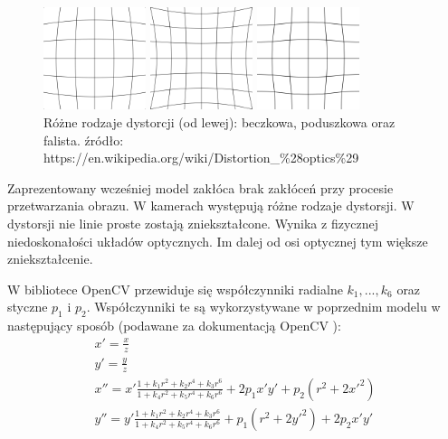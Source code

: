 \documentclass{article}
\begin{document}
\begin{figure}
\centering
		\begin{minipage}{3cm}
			\includegraphics[width=3cm]{600px-Barrel_distortion.png}
		\end{minipage}
		\begin{minipage}{3cm}
			\includegraphics[width=3cm]{600px-Pincushion_distortion.png}
		\end{minipage}
		\begin{minipage}{3cm}
			\includegraphics[width=3cm]{600px-Mustache_distortion.png}
		\end{minipage}
	\caption{Różne rodzaje dystorcji (od lewej): beczkowa, poduszkowa oraz falista.
		źródło: https://en.wikipedia.org/wiki/Distortion\_\%28optics\%29  }
	\label{fig:distortion}
\end{figure}

Zaprezentowany wcześniej model zakłóca brak zakłóceń przy procesie przetwarzania obrazu. W kamerach występują różne rodzaje dystorsji. W dystorsji nie linie proste zostają zniekształcone. Wynika z fizycznej niedoskonałości układów optycznych. Im dalej od osi optycznej tym większe zniekształcenie.

W bibliotece OpenCV przewiduje się współczynniki radialne $k_1, ..., k_6$ oraz styczne $p_1$ i $p_2$. Współczynniki te są wykorzystywane w poprzednim modelu w następujący sposób (podawane za dokumentacją OpenCV \cite{Dokumentacja OpenCV}):
\begin{gather*}
	x' = \frac{x}{z} \\
	y' = \frac{y}{z} \\
	x'' = x' \frac{1+k_1 r^2 + k_2 r^4 + k_3 r^6}{1+k_4 r^2+k_5 r^4+k_6 r^6} +
	2 p_1 x' y' + p_2(r^2 + 2 x'^2)	\\
	y'' = y' \frac{1+k_1 r^2 + k_2 r^4 + k_3 r^6}{1+k_4 r^2+k_5 r^4+k_6 r^6} +
	p_1(r^2 + 2 y'^2) + 2 p_2 x' y'
\end{gather*}
\end{document}
